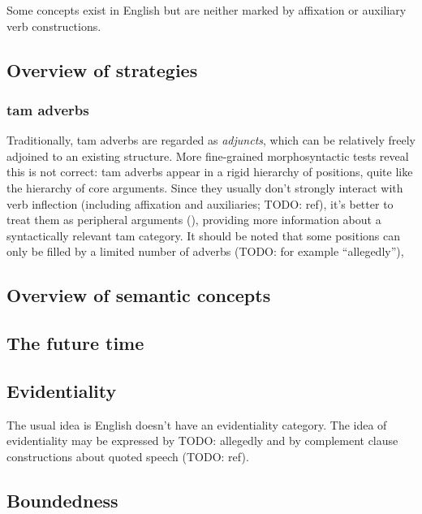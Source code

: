 \documentclass[UTF8, a4paper, oneside, scheme=plain]{ctexrep}
\newcommand*{\term}[1]{\emph{#1}}
\begin{document}
Some concepts exist in English but are neither marked by affixation or auxiliary verb constructions.

\subsection{Overview of strategies}

\subsubsection{\acs{tam} adverbs}\label{sec:tam.adverbs}

Traditionally, \acs{tam} adverbs are regarded as \term{adjuncts},
which can be relatively freely adjoined to an existing structure.
More fine-grained morphosyntactic tests reveal this is not correct:
\acs{tam} adverbs appear in a rigid hierarchy of positions, 
quite like the hierarchy of core arguments.
Since they usually don't strongly interact with verb inflection
(including affixation and auxiliaries; TODO: ref),
it's better to treat them as peripheral arguments (),
providing more information about a syntactically relevant \acs{tam} category.
It should be noted that some positions can only be filled by a limited number of adverbs (TODO: for example ``allegedly''),

\subsection{Overview of semantic concepts}

\subsection{The future time}\label{sec:future}

\subsection{Evidentiality}

The usual idea is English doesn't have an evidentiality category.
The idea of evidentiality may be expressed by TODO: allegedly 
and by complement clause constructions about quoted speech (TODO: ref).

\subsection{Boundedness}
\end{document}
